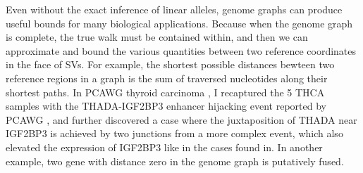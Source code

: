 \documentclass[phd,tocprelim]{cornell}
\begin{document}
Even without the exact inference of linear alleles, genome graphs can produce useful bounds for many biological applications. Because when the genome graph is complete, the true walk must be contained within, and then we can approximate and bound the various quantities between two reference coordinates in the face of SVs. For example, the shortest possible distances bewteen two reference regions in a graph is the sum of traversed nucleotides along their shortest paths. In PCAWG thyroid carcinoma \cite{Panebianco2017-xt}, I recaptured the 5 THCA samples with the THADA-IGF2BP3 enhancer hijacking event reported by PCAWG \cite{Rheinbay2020-no}, and further discovered a case where the juxtaposition of THADA near IGF2BP3 is achieved by two junctions from a more complex event, which also elevated the expression of IGF2BP3 like in the cases found in. In another example, two gene with distance zero in the genome graph is putatively fused.


\end{document}
